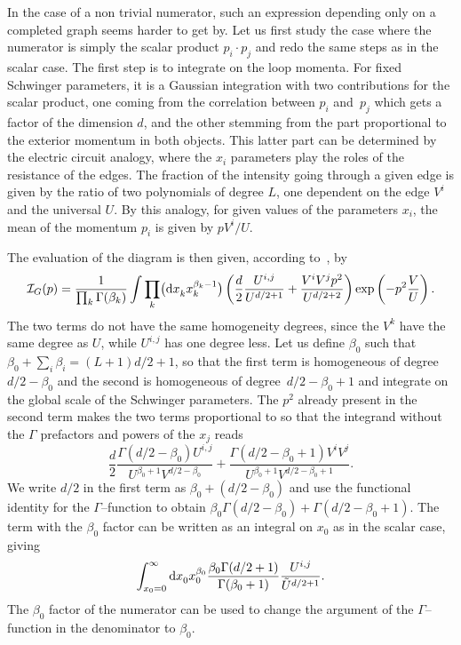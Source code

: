 \documentclass[pdftex]{sigma}
\numberwithin{equation}{section}
\def\cI{{\mathcal I}}
\begin{document}
In the case of a non trivial numerator, such an expression depending only on a completed graph seems harder to get by. Let us first study the case where the numerator is simply the scalar product $p_i\cdot p_j$ and redo the same steps as in the scalar case.
The first step is to integrate on the loop momenta. For fixed Schwinger parameters, it is a Gaussian integration with two
contributions for the scalar product, one coming from the correlation between $p_i$ and~$p_j$ which gets a factor of the dimension $d$, and the other stemming from the part proportional to the exterior momentum in both objects.
This latter part can be determined by the electric circuit analogy, where the $x_i$ parameters play the roles of
the resistance of the edges. The fraction of the intensity going through a given edge is given by the ratio of two
polynomials of degree $L$, one dependent on the edge $V^i$ and the universal $U$. By this analogy, for given
values of the parameters $x_i$, the mean of the momentum $p_i$ is given by $ p V^i/U$.

The evaluation of the diagram is then given, according to~\cite{Na71}, by
\[%
	\cI_G(p) = \frac {1}{ \prod_k \Gamma(\beta_k)} \int \prod_k \bigl( {\rm d}x_k^{\vphantom {\beta_k}} x_k^{\beta_k-1}\bigr)
 		\left(\frac d2 \frac{U^{i,j}}{U^{d/2+1}} + \frac{V^i V^j p^2}{U^{d/2+2}} \right) \exp\left(-p^2 \frac V U\right).
\]
The two terms do not have the same homogeneity degrees, since the $V^k$ have the same degree as $U$, while $U^{i,j}$ has one degree less.
Let us define $\beta_0$ such that $\beta_0 + \sum_i \beta_i = (L+1)d/2 +1$, so that the first term is homogeneous of degree $d/2 - \beta_0$
and the second is homogeneous of degree~${d/2 - \beta_0 +1}$ and integrate on the global scale of the Schwinger parameters. The $p^2$ already present in the second term makes the two terms proportional to  so that the integrand without the $\Gamma$ prefactors and powers of the $x_j$ reads
\[%
 		\frac {d}2 \frac {\Gamma(d/2-\beta_0) U^{i,j}}{U^{\beta_0+1}V^{d/2-\beta_0}} + \frac{ \Gamma(d/2-\beta_0+1)V^i V^j}{U^{\beta_0+1}V^{d/2-\beta_0+1}} .
\]
We write $d/2$ in the first term as $\beta_0 + (d/2 - \beta_0)$ and use the functional identity for the $\Gamma$--function to obtain $\beta_0 \Gamma(d/2 - \beta_0) + \Gamma(d/2 - \beta_0 +1)$. The term with the $\beta_0$ factor can be written as an integral on $x_0$ as in the scalar case, giving
\begin{equation} \label{beta+1}
	\int_{x_0 =0}^\infty {\rm d}x_0 ^{\vphantom{\beta_0}} x_0 ^{\beta_0} \frac { \beta_0 \Gamma(d/2 + 1) }{\Gamma(\beta_0+1) } \frac { U^{i,j} } { \tilde U ^{d/2 +1} }.
\end{equation}
The $\beta_0$ factor of the numerator can be used to change the argument of the $\Gamma$--function in the denominator to $\beta_0$.
\end{document}
